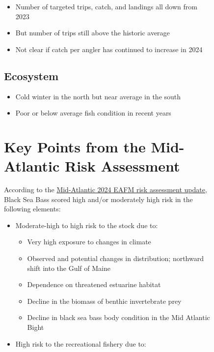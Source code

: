 \documentclass[
  10pt,
  letterpaper,
  DIV=11,
  numbers=noendperiod]{scrartcl}
\providecommand{\tightlist}{%
  \setlength{\itemsep}{0pt}\setlength{\parskip}{0pt}}\usepackage{longtable,booktabs,array}
\begin{document}
\begin{figure}
\begin{minipage}{0.57\linewidth}
\begin{itemize}
\tightlist
\item
  Number of targeted trips, catch, and landings all down from 2023
\item
  But number of trips still above the historic average
\item
  Not clear if catch per angler has continued to increase in 2024
\end{itemize}

\subsection{Ecosystem}

\begin{itemize}
\tightlist
\item
  Cold winter in the north but near average in the south
\item
  Poor or below average fish condition in recent years
\end{itemize}

\end{minipage}%
\newline
\begin{minipage}{\linewidth}

\vspace{0.5cm}
\section{Key Points from the Mid-Atlantic Risk Assessment}

\end{minipage}%
\newline
\begin{minipage}{0.57\linewidth}

\raggedright

According to the
\href{https://static1.squarespace.com/static/511cdc7fe4b00307a2628ac6/t/6747560a3cf66936045e5547/1732728332670/05_EAFM+Risk+Assessment.pdf}{Mid-Atlantic
2024 EAFM risk assessment update}, Black Sea Bass scored high and/or
moderately high risk in the following elements:

\begin{itemize}
\tightlist
\item
  Moderate-high to high risk to the stock due to:

  \begin{itemize}
  \tightlist
  \item
    Very high exposure to changes in climate
  \item
    Observed and potential changes in distribution; northward shift into
    the Gulf of Maine
  \item
    Dependence on threatened estuarine habitat
  \item
    Decline in the biomass of benthic invertebrate prey
  \item
    Decline in black sea bass body condition in the Mid Atlantic Bight
  \end{itemize}
\item
  High risk to the recreational fishery due to:


\end{itemize}
\end{minipage}
\end{figure}
\end{document}
